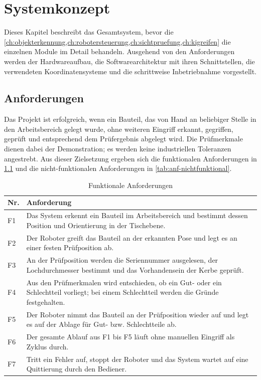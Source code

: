 \chapter{Systemkonzept}
\label{ch:systemkonzept}

Dieses Kapitel beschreibt das Gesamtsystem, bevor die \cref{ch:objekterkennung,ch:robotersteuerung,ch:sichtpruefung,ch:kigreifen}
die einzelnen Module im Detail behandeln. Ausgehend von den Anforderungen werden der
Hardwareaufbau, die Softwarearchitektur mit ihren Schnittstellen, die verwendeten
Koordinatensysteme und die schrittweise Inbetriebnahme vorgestellt.

\section{Anforderungen}
\label{sec:anforderungen}

Das Projekt ist erfolgreich, wenn ein Bauteil, das von Hand an beliebiger Stelle in den
Arbeitsbereich gelegt wurde, ohne weiteren Eingriff erkannt, gegriffen, geprüft und
entsprechend dem Prüfergebnis abgelegt wird. Die Prüfmerkmale dienen dabei der
Demonstration; es werden keine industriellen Toleranzen angestrebt. Aus dieser Zielsetzung
ergeben sich die funktionalen Anforderungen in \cref{tab:anf-funktional} und die
nicht-funktionalen Anforderungen in \cref{tab:anf-nichtfunktional}.

\begin{table}[htbp]
  \centering
  \caption{Funktionale Anforderungen}
  \label{tab:anf-funktional}
  \begin{tabularx}{\textwidth}{@{}lX@{}}
    \toprule
    Nr. & Anforderung \\
    \midrule
    F1 & Das System erkennt ein Bauteil im Arbeitsbereich und bestimmt dessen Position und
         Orientierung in der Tischebene. \\
    F2 & Der Roboter greift das Bauteil an der erkannten Pose und legt es an einer festen
         Prüfposition ab. \\
    F3 & An der Prüfposition werden die Seriennummer ausgelesen, der Lochdurchmesser
         bestimmt und das Vorhandensein der Kerbe geprüft. \\
    F4 & Aus den Prüfmerkmalen wird entschieden, ob ein Gut- oder ein Schlechtteil vorliegt;
         bei einem Schlechtteil werden die Gründe festgehalten. \\
    F5 & Der Roboter nimmt das Bauteil an der Prüfposition wieder auf und legt es auf der
         Ablage für Gut- bzw. Schlechtteile ab. \\
    F6 & Der gesamte Ablauf aus F1 bis F5 läuft ohne manuellen Eingriff als Zyklus durch. \\
    F7 & Tritt ein Fehler auf, stoppt der Roboter und das System wartet auf eine Quittierung
         durch den Bediener. \\
    \bottomrule
  \end{tabularx}
\end{table}

